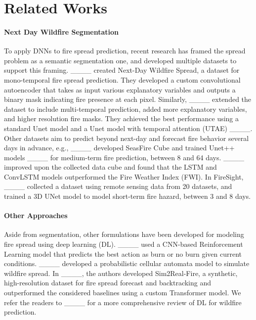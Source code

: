 \section{Related Works}
\label{sec:related_works}
\paragraph{Next Day Wildfire Segmentation} To apply DNNs to fire spread prediction, recent research has framed the spread problem as a semantic segmentation one, and developed multiple datasets to support this framing. ____ created Next-Day Wildfire Spread, a dataset for mono-temporal fire spread prediction. They developed a custom convolutional autoencoder that takes as input various explanatory variables and outputs a binary mask indicating fire presence at each pixel. Similarly, ____ extended the dataset to include multi-temporal prediction, added more explanatory variables, and higher resolution fire masks. They achieved the best performance using a standard Unet model and a Unet model with temporal attention (UTAE) ____. Other datasets aim to predict beyond next-day and forecast fire behavior several days in advance, e.g., ____ developed SeasFire Cube and trained Unet++ models ____ for medium-term fire prediction, between 8 and 64 days. ____ improved upon the collected data cube and found that the LSTM and ConvLSTM models outperformed the Fire Weather Index (FWI). In FireSight, ____ collected a dataset using remote sensing data from 20 datasets, and trained a 3D UNet model to model short-term fire hazard, between 3 and 8 days.  

\paragraph{Other Approaches}  Aside from segmentation, other formulations have been developed for modeling fire spread using deep learning (DL). ____ used a CNN-based Reinforcement Learning model that predicts the best action as burn or no burn given current conditions. ____ developed a probabilistic cellular automata model to simulate wildfire spread. In ____, the authors developed Sim2Real-Fire, a synthetic, high-resolution dataset for fire spread forecast and backtracking and outperformed the considered baselines using a custom Transformer model. We refer the readers to ____ for a more comprehensive review of DL for wildfire prediction. 

